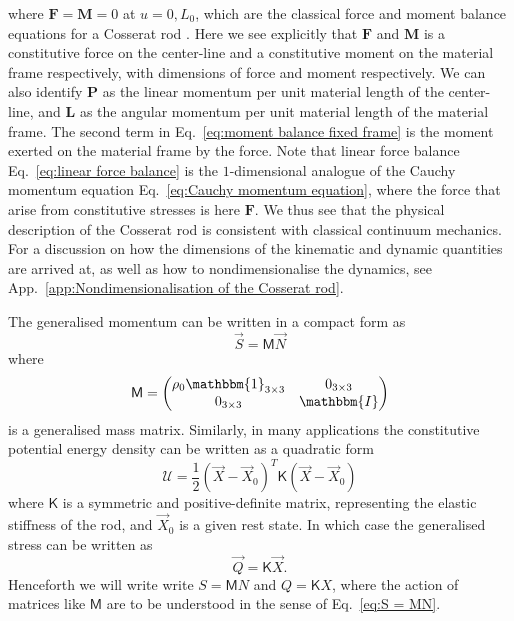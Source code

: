 where $\mathbf{F} = \mathbf{M} = 0$ at $u = 0, L_0$, which are the classical force and moment balance equations for a Cosserat rod \citep{cosseratTheoryDeformableBodies1909, simoGeometricallyexactRodModel1991}. Here we see explicitly that $\mathbf{F}$ and $\mathbf{M}$ is a constitutive force on the center-line and a constitutive moment on the material frame respectively, with dimensions of force and moment respectively. We can also identify $\mathbf{P}$ as the linear momentum per unit material length of the center-line, and $\mathbf{L}$ as the angular momentum per unit material length of the material frame. The second term in Eq.~\ref{eq:moment balance fixed frame} is the moment exerted on the material frame by the force. Note that linear force balance Eq.~\ref{eq:linear force balance} is  the $1$-dimensional analogue of the Cauchy momentum equation Eq.~\ref{eq:Cauchy momentum equation}, where the force that arise from constitutive stresses is here $\mathbf{F}$. We thus see that the physical description of the Cosserat rod is consistent with classical continuum mechanics. For a discussion on how the dimensions of the kinematic and dynamic quantities are arrived at, as well as how to nondimensionalise the dynamics, see App.~\ref{app:Nondimensionalisation of the Cosserat rod}.

The generalised momentum can be written in a compact form as
\begin{equation} \label{eq:S = MN}
\vec{S} = \mathsf{M} \vec{N} 
\end{equation}
where
\begin{equation} \label{eq:Cosserat rod mass matrix}
\mathsf{M} = \begin{pmatrix}
\rho_0 \mathbbm{1}_{3 \times 3} & 0_{3 \times 3} \\
0_{3 \times 3} & \mathbbm{I}
\end{pmatrix}
\end{equation}
is a generalised mass matrix. Similarly, in many applications the constitutive potential energy density can be written as a quadratic form
\begin{equation} \label{eq:U quadratic form}
\mathcal{U} = \frac{1}{2} (\vec{X} - \vec{X}_0)^T \mathsf{K} (\vec{X} - \vec{X}_0)
\end{equation}
where $\mathsf{K}$ is a symmetric and positive-definite matrix, representing the elastic stiffness of the rod, and $\vec{X}_0$ is a given rest state. In which case the generalised stress can be written as
\begin{equation}
\vec{Q} = \mathsf{K} \vec{X}.
\end{equation}
Henceforth we will write write $S = \mathsf{M} N$ and $Q = \mathsf{K} X$, where the action of matrices like $\mathsf{M}$ are to be understood in the sense of Eq.~\ref{eq:S = MN}.

